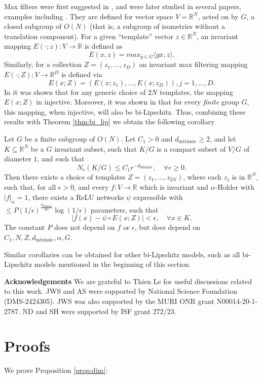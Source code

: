 \documentclass[twoside,11pt]{article}
\newcommand{\RR}{\mathbb{R}}
\newcommand{\dint}{d_{\text{intrinsic}}}
\begin{document}
Max filters were first suggested in \cite{cahill2024group}, and were later studied in several papers, examples including \cite{mixon2023max,max_mixon2025,max_QADDURA}.
They are defined for vector space $V=\RR^N$, acted on by  $G$,  a closed subgroup of $O(N)$ (that is, a subgroup of isometries without a translation component). For a given ``template'' vector $z\in \RR^N$, an invariant mapping $E(\cdot;z):V\to \RR $ is defined as 
$$E(x,z)=max_{g\in G} \langle gx,z \rangle . $$
Similarly, for a collection $Z=(z_1,\ldots,z_D)$ an invariant max filtering mapping $E(\cdot;Z):V\to \RR^D $ is defined via 
$$E(x;Z)=\left(E(x;z_1),\ldots, E(x;z_D) \right), j=1,\ldots,D.$$
In \cite{cahill2024group} it was shown that for any generic choice of $2N$ templates, the mapping $E(x;Z) $ in injective. Moreover, it was shown in \cite{balan2023g} that for every \emph{finite} group $G$, this mapping, when injective, will also be bi-Lipschitz. Thus, combining these results with Theorem \ref{thm:bi_lip} we obtain the following corollary 
\begin{cor}
Let $G$ be a finite subgroup of $O(N)$. Let $C_1>0$ and $\dint\geq 2 $, and let $K\subseteq \RR^N$ be a $G$ invariant subset, such that $K/G$ is a  compact subset of  $V/G$ of diameter $1$, and such that
$$N_r(K/G)\leq C_1r^{-\dint}, \quad \forall r\geq 0 .$$
Then there exists a choice of templates $Z=(z_1,\ldots,z_{2N})$, where each  $z_j$ is in $\RR^N $, such that, for all $\epsilon>0$, and every
$f:V \to \RR$  which is invariant and $\alpha$-Holder with $|f|_\alpha=1 $,  there exists a ReLU networks $\psi$ expressible with  $\leq  P(1/\epsilon)^{\frac{\dint}{2\alpha}}\log(1/\epsilon) $ parameters, such that 
$$|f(x)-\psi\circ E(x;Z)|<\epsilon, \quad  \forall x \in K .$$
The constant $P$ does not depend on $f$ or $\epsilon$, but does depend on $C_1,N,Z,\dint,\alpha,G$.  
\end{cor}
Similar corollaries can be obtained for other bi-Lipschitz models, such as all bi-Lipschitz models mentioned in the beginning of this section. 


\textbf{Acknowledgements}
We are grateful to Thien Le for useful discussions related to this work. JWS and AS were supported by National Science Foundation (DMS-2424305). JWS was also supported by the MURI ONR grant N00014-20-1-2787. ND and SH were supported by ISF grant  272/23.


    
\appendix
\section{Proofs}
We prove Proposition \ref{prop:dim}:
\end{document}
